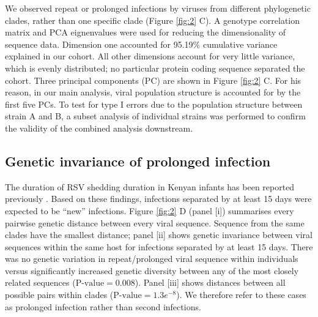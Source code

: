 \documentclass{article} %
\begin{document}
We observed repeat or prolonged infections by viruses from different phylogenetic clades, rather than one specific clade 
(Figure \ref{fig:2} C).
A genotype correlation matrix and PCA eignenvalues were used for reducing the dimensionality of sequence data.
Dimension one accounted for 95.19\% cumulative variance explained in our cohort.
All other dimensions account for very little variance, which is evenly distributed; no particular protein coding sequence separated the cohort.
Three principal components (PC) are shown in Figure \ref{fig:2} C.
For his reason, in our main analysis, viral population structure is accounted for by the first five PCs. 
To test for type I errors due to the population structure between strain A and B, 
a subset analysis of individual strains was performed to confirm the validity of the combined analysis downstream.


\subsection{Genetic invariance of prolonged infection}
The duration of RSV shedding duration in Kenyan infants has been reported previously
\cite{okiro2010duration}.
Based on these findings, infections separated by at least 15 days were expected to be ``new'' infections. 
Figure \ref{fig:2} D (panel [i]) summarises every pairwise genetic distance between every viral sequence.
Sequence from the same clades have the smallest distance; panel [ii] shows genetic invariance between viral sequences within the same host for infections separated by at least 15 days. 
There was no genetic variation in repeat/prolonged viral sequence within individuals versus significantly increased genetic diversity between any of the most closely related sequences ($\text{P-value} = 0.008$).
Panel [iii] shows distances between all possible pairs within clades ($\text{P-value} = 1.3e^{-8}$).
We therefore refer to these cases as prolonged infection rather than second infections.
\end{document}
